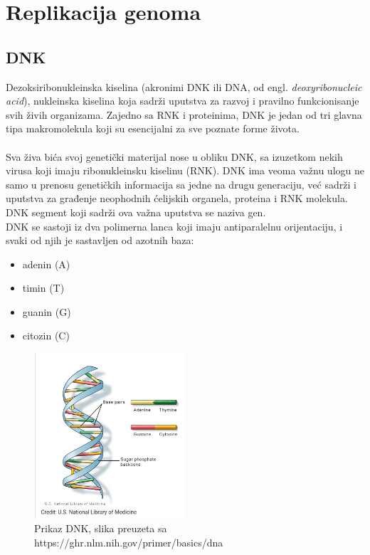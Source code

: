 \newpage

\section{Replikacija genoma}
\label{sec:replikacija}

\subsection{DNK}

Dezoksiribonukleinska kiselina (akronimi DNK ili DNA, od engl. \textit{ deoxyribonucleic acid}), nukleinska kiselina koja sadrži uputstva za razvoj i pravilno funkcionisanje svih živih organizama. Zajedno sa RNK i proteinima, DNK je jedan od tri glavna tipa makromolekula koji su esencijalni za sve poznate forme života. \\\\
Sva živa bića svoj genetički materijal nose u obliku DNK, sa izuzetkom nekih virusa koji imaju ribonukleinsku kiselinu (RNK). DNK ima veoma važnu ulogu ne samo u prenosu genetičkih informacija sa jedne na drugu generaciju, već sadrži i uputstva za građenje neophodnih ćelijskih organela, proteina i RNK molekula. DNK segment koji sadrži ova važna uputstva se naziva gen.\\

DNK se sastoji iz dva polimerna lanca koji imaju antiparalelnu orijentaciju, i svaki od njih je sastavljen od azotnih baza:
\begin{itemize}
	\item adenin (A)
	\item timin (T)
	\item guanin (G)
	\item citozin (C)
\end{itemize}

\begin{figure}[h]
\caption{Prikaz DNK, slika preuzeta sa https://ghr.nlm.nih.gov/primer/basics/dna}
\centering
\includegraphics[width=0.5\textwidth]{poglavlja/1/slike/DNK.png}
\end{figure} 

